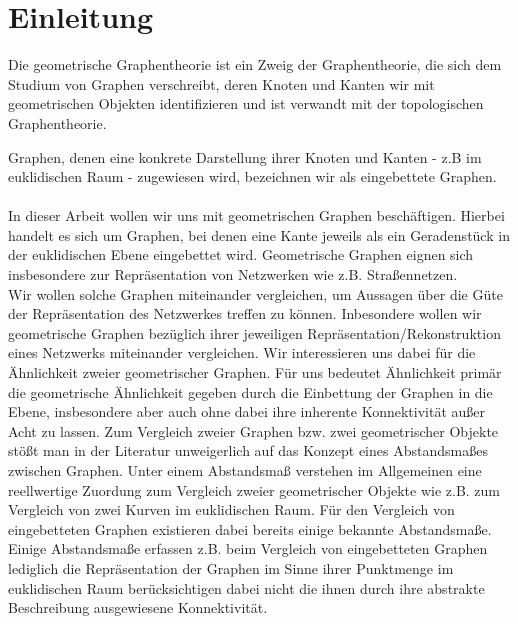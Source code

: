 \documentclass[a4paper, 12pt, twoside]{article}
\theoremstyle{Format1} %
\begin{document}
\newpage
\tableofcontents
\newpage\null\thispagestyle{empty}\newpage %
\section{Einleitung}

Die geometrische Graphentheorie ist ein Zweig der Graphentheorie, die sich dem Studium von Graphen verschreibt, deren Knoten und Kanten wir mit geometrischen Objekten identifizieren
und ist verwandt mit der topologischen Graphentheorie.

Graphen, denen eine konkrete Darstellung ihrer Knoten und Kanten - z.B im euklidischen Raum - zugewiesen wird, bezeichnen wir als eingebettete Graphen.
\\
\\
In dieser Arbeit wollen wir uns mit geometrischen Graphen beschäftigen. Hierbei handelt es sich um Graphen,
bei denen eine Kante jeweils als ein Geradenstück in der euklidischen Ebene eingebettet wird.
Geometrische Graphen eignen sich insbesondere zur Repräsentation von Netzwerken wie z.B. Straßennetzen.
\\
Wir wollen solche Graphen miteinander vergleichen, um Aussagen über die Güte der Repräsentation des Netzwerkes treffen zu können.
Inbesondere wollen wir geometrische Graphen bezüglich ihrer jeweiligen Repräsentation/Rekonstruktion eines Netzwerks miteinander vergleichen.
Wir interessieren uns dabei für die Ähnlichkeit zweier geometrischer Graphen. Für uns bedeutet Ähnlichkeit primär die geometrische Ähnlichkeit gegeben durch die
Einbettung der Graphen in die Ebene, insbesondere aber auch ohne dabei ihre inherente Konnektivität außer Acht zu lassen.
Zum Vergleich zweier Graphen bzw. zwei geometrischer Objekte stößt man in der Literatur unweigerlich auf das Konzept eines Abstandsmaßes zwischen Graphen.
Unter einem Abstandsmaß verstehen im Allgemeinen eine reellwertige Zuordung zum Vergleich zweier geometrischer Objekte wie z.B. zum Vergleich von zwei Kurven im euklidischen Raum.
Für den Vergleich von eingebetteten Graphen existieren dabei bereits einige bekannte Abstandsmaße.
\\
Einige Abstandsmaße erfassen z.B. beim Vergleich von eingebetteten Graphen lediglich die Repräsentation der Graphen im Sinne ihrer Punktmenge im euklidischen Raum berücksichtigen dabei nicht die ihnen
durch ihre abstrakte Beschreibung ausgewiesene Konnektivität.
\\
\end{document}
